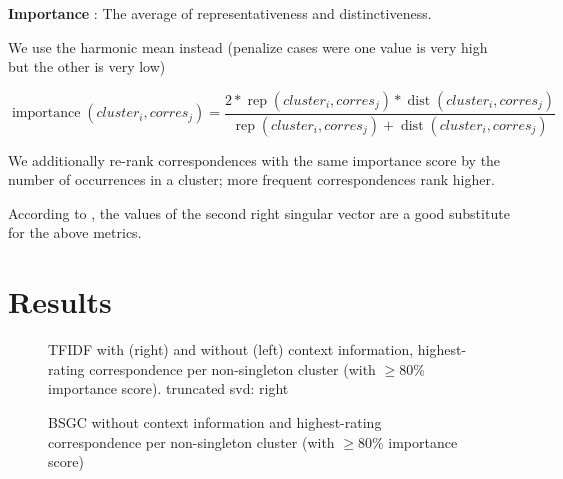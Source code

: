 \documentclass[a4paper]{article}
\begin{document}
\textbf{Importance}
\citet{wieling2011bipartite}: 
The average of representativeness and distinctiveness.

We use the harmonic mean instead (penalize cases were one value is very high but the other is very low)

\begin{equation*}
\operatorname{importance}(cluster_i, corres_j) = 
\frac{
2 * \operatorname{rep}(cluster_i, corres_j) * \operatorname{dist}(cluster_i, corres_j)}
{\operatorname{rep}(cluster_i, corres_j) + \operatorname{dist}(cluster_i, corres_j)}
\end{equation*}

We additionally re-rank correspondences with the same importance score by the number of occurrences in a cluster; more frequent correspondences rank higher.


According to \citet{wieling2010hierarchical}, the values of the second right singular vector are a good substitute for the above metrics.

\newpage
\section{Results}

\begin{figure}
    \begin{adjustwidth}{-0.6cm}{-0.5cm}
    \centering
    
    \hspace{-5mm}
    
    \end{adjustwidth}
    \caption{TFIDF with (right) and without (left) context information, highest-rating correspondence per non-singleton cluster (with $\geq$80\% importance score). truncated svd: right}
    \label{fig:tfidf-nocontext}
\end{figure}

\begin{figure}
  
  \caption{BSGC without context information and highest-rating correspondence per non-singleton cluster (with $\geq$80\% importance score)}
  \label{fig:bsgc-nocontext}
\end{figure}
\end{document}
